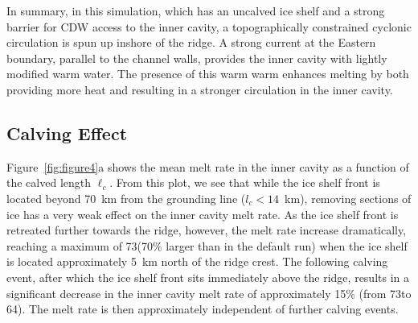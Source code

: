 \documentclass[draft]{agujournal2019}
\begin{document}
In summary, in this simulation, which has an uncalved ice shelf and a strong barrier for CDW access to the inner cavity, a topographically constrained cyclonic circulation is spun up inshore of the ridge. A strong current at the Eastern boundary, parallel to the channel walls, provides the inner cavity with lightly modified warm water. The presence of this warm warm enhances melting by both providing more heat and resulting in a stronger circulation in the inner cavity. %

\subsection{Calving Effect}
Figure~\ref{fig:figure4}a shows the mean melt rate in the inner cavity as a function of the calved length $\ell_c$. From this plot, we see that while the ice shelf front is located beyond 70~km from the grounding line ($l_c < 14$~km), removing sections of ice has a very weak effect on the inner cavity melt rate. As the ice shelf front is retreated further towards the ridge, however, the melt rate increase dramatically, reaching a maximum of 73\mpryr (70\% larger than in the default run) when the ice shelf is located approximately 5~km north of the ridge crest. The following calving event, after which the ice shelf front sits immediately above the ridge, results in a significant decrease in the inner cavity melt rate of approximately 15\% (from 73\mpryr to 64\mpryr). The melt rate is then approximately independent of further calving events.
\end{document}
